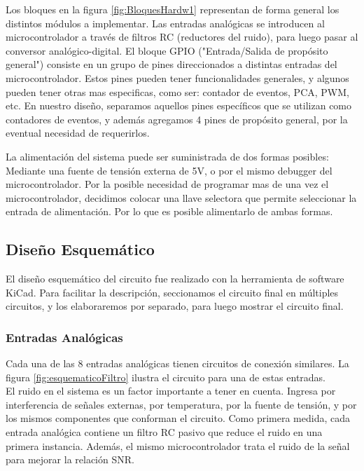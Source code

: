Los bloques en la figura \ref{fig:BloquesHardw1} representan de forma general los distintos módulos a implementar. Las entradas analógicas se introducen al microcontrolador a través de filtros RC (reductores del ruido), para luego pasar al conversor analógico-digital. El bloque GPIO ("Entrada/Salida de propósito general") consiste en un grupo de pines direccionados a distintas entradas del microcontrolador. Estos pines pueden tener funcionalidades generales, y algunos pueden tener otras mas especificas, como ser: contador de eventos, PCA, PWM, etc. En nuestro diseño, separamos aquellos pines específicos que se utilizan como contadores de eventos, y además agregamos 4 pines de propósito general, por la eventual necesidad de requerirlos. 

La alimentación del sistema puede ser suministrada de dos formas posibles: Mediante una fuente de tensión externa de 5V, o por el mismo debugger del microcontrolador. Por la posible necesidad de programar mas de una vez el microcontrolador, decidimos colocar una llave selectora que permite seleccionar la entrada de alimentación. Por lo que es posible alimentarlo de ambas formas.


\subsection{Diseño Esquemático}
\label{it3:sub:diseno_esquematico}

El diseño esquemático del circuito fue realizado con la herramienta de software KiCad. Para facilitar la descripción, seccionamos el circuito final en múltiples circuitos, y los elaboraremos por separado, para luego mostrar el circuito final.

\subsubsection{Entradas Analógicas}
\label{it3:ssub:entradas_analogicas}

Cada una de las 8 entradas analógicas tienen circuitos de conexión similares. La figura \ref{fig:esquematicoFiltro} ilustra el circuito para una de estas entradas. \\

El ruido en el sistema es un factor importante a tener en cuenta. Ingresa por interferencia de señales externas, por temperatura, por la fuente de tensión, y por los mismos componentes que conforman el circuito. Como primera medida, cada entrada analógica contiene un filtro RC pasivo que reduce el ruido en una primera instancia. Además, el mismo microcontrolador trata el ruido de la señal para mejorar la relación SNR. \\

